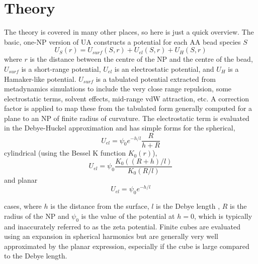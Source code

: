 \documentclass[10pt,a4paper,onecolumn]{report}
\begin{document}
\section{Theory}
The theory is covered in many other places, so here is just a quick overview. The basic, one-NP version of UA constructs a potential for each AA bead species $S$
\begin{equation}
U_S(r) =   U_{surf}(S,r) + U_{el}(S,r) +  U_H(S,r)
\end{equation} 
 where $r$ is the distance between the centre of the NP and the centre of the bead, $U_{surf}$ is a short-range potential, $U_{el}$ is an electrostatic potential, and  $U_H$ is a Hamaker-like potential. $U_{surf}$ is a tabulated potential extracted from metadynamics simulations to include the very close range repulsion, some electrostatic terms, solvent effects, mid-range vdW attraction, etc. A correction factor is applied to map these from the tabulated form generally computed for a plane to an NP of finite radius of curvature. The electrostatic term is evaluated in the Debye-Huckel approximation and has simple forms for the spherical,
 \begin{equation}
 U_{el} = \psi_0 e^{-h/l}\frac{R}{h + R}
 \end{equation}
  cylindrical (using the Bessel K function $K_0(r)$),
 \begin{equation}
 U_{el} = \psi_0  \frac{K_0( (R + h)/l)}{K_0(R/l)}
 \end{equation}
and planar
  \begin{equation}
 U_{el} = \psi_0 e^{-h/l}  
 \end{equation}

 cases, where $h$ is the distance from the surface, $l$ is the Debye length , $R$ is the radius of the NP and $\psi_0$ is the value of the potential at $h=0$, which is typically and inaccurately referred to as the zeta potential. Finite cubes are evaluated using an expansion in spherical harmonics but are generally very well approximated by the planar expression, especially if the cube is large compared to the Debye length. 

 
 
\end{document}
